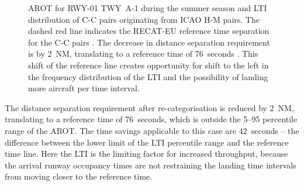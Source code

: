 \begin{figure}[h]
    \caption[AROT for RWY~01 and LTI of C-C pairs from ICAO H-M pairs]{AROT for RWY-01 TWY~A-1 during the summer season and LTI distribution of C-C pairs originating from ICAO H-M pairs. The dashed red line indicates the RECAT-EU reference time separation for the C-C pairs \protect{}. The decrease in distance separation requirement is by 2~NM, translating to a reference time of 76~seconds \protect{}. This shift of the reference line creates opportunity for shift to the left in the frequency distribution of the LTI and the possibility of landing more aircraft per time interval.}\label{fig:best_CC_from_HM_pairs_time_sep}
\end{figure}

The distance separation requirement after re-categorisation is reduced by 2~NM, translating to a reference time of 76~seconds, which is outside the 5--95 percentile range of the AROT. The time savings applicable to this case are 42~seconds -- the difference between the lower limit of the LTI percentile range and the reference time line. Here the LTI is the limiting factor for increased throughput, because the arrival runway occupancy times are not restraining the landing time intervals from moving closer to the reference time.

